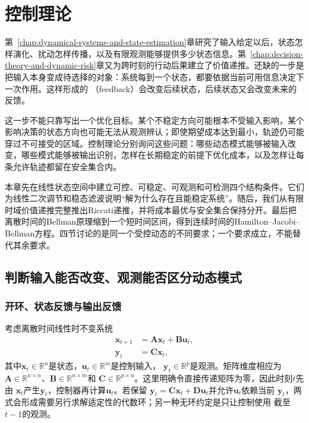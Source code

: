 \chapter{控制理论}
\label{chap:control-theory}

第~\ref{chap:dynamical-systems-and-state-estimation}章研究了输入给定以后，状态怎样演化、扰动怎样传播，以及有限观测能够提供多少状态信息。第~\ref{chap:decision-theory-and-dynamic-risk}章又为跨时刻的行动后果建立了价值递推。还缺的一步是把输入本身变成待选择的对象：系统每到一个状态，都要依据当前可用信息决定下一次作用。这样形成的
（feedback）会改变后续状态，后续状态又会改变未来的反馈。

这一步不能只靠写出一个优化目标。某个不稳定方向可能根本不受输入影响，某个影响决策的状态方向也可能无法从观测辨认；即使期望成本达到最小，轨迹仍可能穿过不可接受的区域。控制理论分别询问这些问题：哪些动态模式能够被输入改变，哪些模式能够被输出识别，怎样在长期稳定的前提下优化成本，以及怎样让每条允许轨迹都留在安全集合内。

本章先在线性状态空间中建立可控、可稳定、可观测和可检测四个结构条件。它们为线性二次调节和稳态滤波说明“解为什么存在且能稳定系统”。随后，我们从有限时域价值递推完整推出Riccati递推，并将成本最优与安全集合保持分开。最后把离散时间的Bellman原理缩到一个短时间区间，得到连续时间的Hamilton--Jacobi--Bellman方程。四节讨论的是同一个受控动态的不同要求；一个要求成立，不能替代其余要求。
\section{判断输入能否改变、观测能否区分动态模式}
\label{sec:control-feedback-structure}
\subsection{开环、状态反馈与输出反馈}
考虑离散时间线性时不变系统
\begin{equation}
  \begin{aligned}
    \bm{x}_{t+1}
      &=\bm{A}\bm{x}_t+\bm{B}\bm{u}_t,\\
    \bm{y}_t
      &=\bm{C}\bm{x}_t,
  \end{aligned}
  \label{eq:control-state-space}
\end{equation}
其中$\bm{x}_t\in\mathbb{R}^{n}$是状态，$\bm{u}_t\in\mathbb{R}^{m}$是控制输入，
$\bm{y}_t\in\mathbb{R}^{p}$是观测。矩阵维度相应为
$\bm{A}\in\mathbb{R}^{n\times n}$、$\bm{B}\in\mathbb{R}^{n\times m}$和
$\bm{C}\in\mathbb{R}^{p\times n}$。这里明确令直接传递矩阵为零，因此时刻$t$先由
$\bm{x}_t$产生$\bm{y}_t$，控制器再计算$\bm{u}_t$。若保留
$\bm{y}_t=\bm{C}\bm{x}_t+\bm{D}\bm{u}_t$并允许$\bm{u}_t$依赖当前
$\bm{y}_t$，两式会形成需要另行求解适定性的代数环；另一种无环约定是只让控制使用
截至$t-1$的观测。

